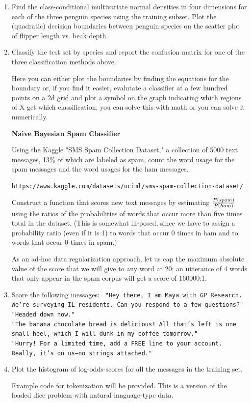 \documentclass[12pt]{book}
\theoremstyle{definition}
\begin{document}
\begin{enumerate}
\item
Find the class-conditional multivariate normal densities in four dimensions for each of the three penguin species using the training subset.
Plot the (quadratic) decision boundaries between penguin species on the scatter plot of flipper length vs. beak depth.

\item
Classify the test set by species and report the confusion matrix for one of the three classification methods above.

Here you can either plot the boundaries by finding the equations for the boundary or, if you find it easier, evalutate a classifier at a few hundred points on a 2d grid and plot a symbol on the graph indicating which regions of X get which classification; you can solve this with math or you can solve it numerically.  

\textbf{Naive Bayesian Spam Classifier}

Using the Kaggle "SMS Spam Collection Dataset," a collection of 5000 text messages, 13\% of which are labeled as spam, count the word usage for the spam messages and the word usages for the ham messages.

\texttt{https://www.kaggle.com/datasets/uciml/sms-spam-collection-dataset/}

Construct a function that scores new text messages by estimating $ {P (spam ) \over P(ham) } $
using the ratios of the probabilities of words that occur more than five times total in the dataset.
(This is somewhat ill-posed, since we have to assign a probability ratio (even if it is 1) to words that
occur 0 times in ham and to words that occur 0 times in spam.)

As an ad-hoc data regularization approach, let us cap the maximum absolute value of the score that we will give to any
word at 20; an utterance of 4 words that only appear in the spam corpus will get a score of 160000:1.

\item
Score the following  messages:
\texttt{
"Hey there, I am Maya with GP Research.  We're surveying IL residents.  Can you respond to a few questions?" \\
"Headed down now."  \\
"The banana chocolate bread is delicious!  All that's left is one small heel, which I will dunk in my coffee tomorrow." \\
"Hurry! For a limited time, add a FREE line to your account.  Really, it's on us–no strings attached." \\
}

\item
Plot the histogram of log-odds-scores for all the messages in the training set.

Example code for tokenization will be provided.  This is a version of the loaded dice problem with natural-language-type data.

\end{enumerate}
\end{document}
